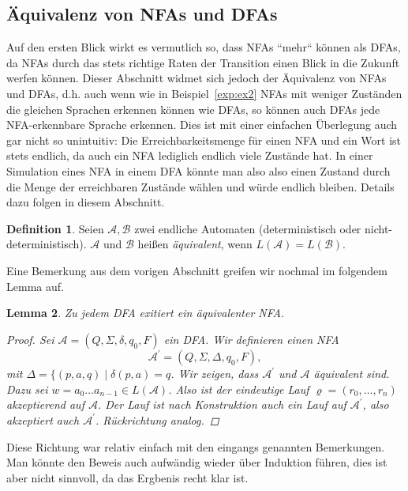 \documentclass[11pt, a4paper]{article}
\theoremstyle{definition}
\newtheorem{definition}{Definition}[section]
\theoremstyle{plain}
\newtheorem{lemma}[definition]{Lemma}
\numberwithin{equation}{section}
\begin{document}
\subsection{Äquivalenz von NFAs und DFAs}\label{regular_equivalence}
Auf den ersten Blick wirkt es vermutlich so, dass NFAs ``mehr`` können als DFAs, da NFAs durch das stets richtige Raten der Transition einen Blick in die Zukunft werfen können. Dieser Abschnitt widmet sich jedoch der Äquivalenz von NFAs und DFAs, d.h. auch wenn wie in Beispiel~\ref{exp:ex2} NFAs mit weniger Zuständen die gleichen Sprachen erkennen können wie DFAs, so können auch DFAs jede NFA-erkennbare Sprache erkennen. Dies ist mit einer einfachen Überlegung auch gar nicht so unintuitiv: Die Erreichbarkeitsmenge für einen NFA und ein Wort ist stets endlich, da auch ein NFA lediglich endlich viele Zustände hat. In einer Simulation eines NFA in einem DFA könnte man also also einen Zustand durch die Menge der erreichbaren Zustände wählen und würde endlich bleiben. Details dazu folgen in diesem Abschnitt.
\begin{definition}
	Seien \( \mathcal{A}, \mathcal{B} \) zwei endliche Automaten (deterministisch oder nicht-deterministisch). \( \mathcal{A} \) und \( \mathcal{B} \) heißen \textit{äquivalent}, wenn \( L(\mathcal{A}) = L(\mathcal{B}) \).
\end{definition}
Eine Bemerkung aus dem vorigen Abschnitt greifen wir nochmal im folgendem Lemma auf.
\begin{lemma}\label{lem:dfa2nfa}
	Zu jedem DFA exitiert ein äquivalenter NFA.
	\begin{proof}
		Sei \( \mathcal{A} = (Q, \Sigma, \delta, q_0, F) \) ein DFA. Wir definieren einen NFA
		\[
			\mathcal{A}^\prime = (Q, \Sigma, \Delta, q_0, F),
		\]
		mit \( \Delta = \{ (p, a, q) \mid \delta(p, a) = q \). Wir zeigen, dass \( \mathcal{A}^\prime \) und \( \mathcal{A} \) äquivalent sind. Dazu sei \( w = a_0 \ldots a_{n-1} \in L(\mathcal{A}) \). Also ist der eindeutige Lauf \( \varrho = (r_0, \ldots, r_n) \) akzeptierend auf \( \mathcal{A} \). Der Lauf ist nach Konstruktion auch ein Lauf auf \( \mathcal{A}^\prime \), also akzeptiert auch \( \mathcal{A}^\prime \). Rückrichtung analog.
	\end{proof}
\end{lemma}
Diese Richtung war relativ einfach mit den eingangs genannten Bemerkungen. Man könnte den Beweis auch aufwändig wieder über Induktion führen, dies ist aber nicht sinnvoll, da das Ergbenis recht klar ist.
\end{document}
